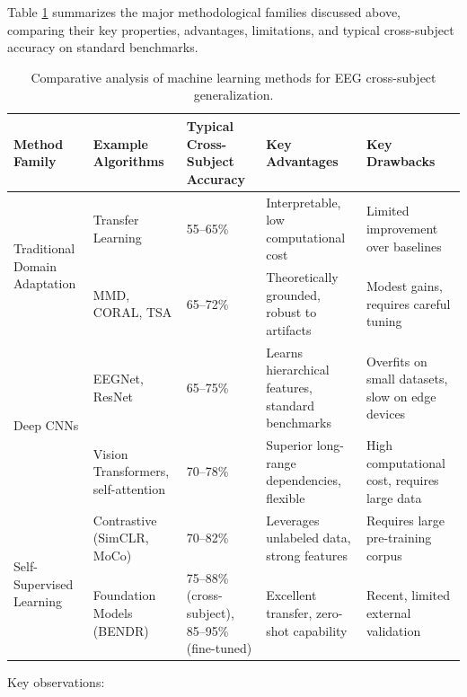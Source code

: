 \documentclass[11pt]{article}
\begin{document}
Table \ref{tab:methods_comparison} summarizes the major methodological families discussed above, comparing their key properties, advantages, limitations, and typical cross-subject accuracy on standard benchmarks.

\begin{table}[H]
\centering
\caption{Comparative analysis of machine learning methods for EEG cross-subject generalization.}
\label{tab:methods_comparison}
\small
\begin{tabular}{|p{2.2cm}|p{1.6cm}|p{2.0cm}|p{2.0cm}|p{2.2cm}|}
\hline
\textbf{Method Family} & \textbf{Example Algorithms} & \textbf{Typical Cross-Subject Accuracy} & \textbf{Key Advantages} & \textbf{Key Drawbacks} \\
\hline
\multirow{2}{*}{Traditional Domain Adaptation} & Transfer Learning & 55--65\% & Interpretable, low computational cost & Limited improvement over baselines \\
\cline{2-5}
& MMD, CORAL, TSA & 65--72\% & Theoretically grounded, robust to artifacts & Modest gains, requires careful tuning \\
\hline
\multirow{2}{*}{Deep CNNs} & EEGNet, ResNet & 65--75\% & Learns hierarchical features, standard benchmarks & Overfits on small datasets, slow on edge devices \\
\hline
\multirow{2}{*}{Deep Transformers} & Vision Transformers, self-attention & 70--78\% & Superior long-range dependencies, flexible & High computational cost, requires large data \\
\hline
\multirow{2}{*}{Self-Supervised Learning} & Contrastive (SimCLR, MoCo) & 70--82\% & Leverages unlabeled data, strong features & Requires large pre-training corpus \\
\cline{2-5}
& Foundation Models (BENDR) & 75--88\% (cross-subject), 85--95\% (fine-tuned) & Excellent transfer, zero-shot capability & Recent, limited external validation \\
\hline
\end{tabular}
\end{table}

Key observations:
\end{document}

